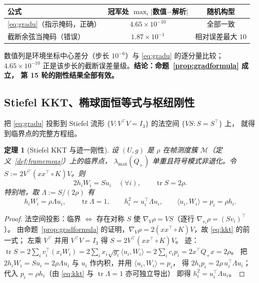 \documentclass[UTF8,11pt]{ctexart}
\newtheorem{theorem}{定理}[section]
\theoremstyle{definition}
\newcommand{\Lam}{\Lambda}
\newcommand{\tr}{\operatorname{tr}}
\begin{document}
\begin{center}\small
\begin{tabular}{lcc}
\hline
公式 & 冠军处 $\max_i\lvert$数值$-$解析$\rvert$ & 随机构型 \\
\hline
\eqref{eq:gradu}（指示掩码，正确） & $4.65\times10^{-10}$ & 全部一致 \\
截断余弦当掩码（错误） & $1.87\times10^{-1}$ & 相对误差最大 $10$ \\
\hline
\end{tabular}
\end{center}

\noindent 数值列是环境坐标中心差分（步长 $10^{-6}$）与 \eqref{eq:gradu} 的逐分量比较；
$4.65\times10^{-10}$ 正是该步长的截断误差量级。\textbf{结论：命题~\ref{prop:gradformula} 成立，
第 15 轮的刚性结果全部有效。}

\subsection{Stiefel KKT、椭球面恒等式与枢纽刚性}\label{sec:r17:kkt}

把 \eqref{eq:gradu} 投影到 Stiefel 流形 $\{V:V^\top V=I_3\}$ 的法空间 $\{VS:S=S^\top\}$ 上，
就得到临界点的完整方程组。

\begin{theorem}[Stiefel KKT 与迹一刚性]\label{thm:stiefelkkt}
设 $(U,g)$ 是 $\rho$ 在帧测度簇 $\mathcal M$（定义~\ref{def:framemeas}）上的临界点，
$\lambda_{\max}(Q_+)$ 单重且符号模式非退化。令 $S:=2V^\top(xx^\top\!\circ K)V$。则
\begin{equation}\label{eq:kkt}
2h_iW_i=Su_i\quad(\forall i),\qquad \tr S=2\rho .
\end{equation}
特别地，取 $\Lam:=S/(2\rho)$ 有
\begin{equation}\label{eq:trace1}
h_iW_i=\rho\Lam u_i,\qquad \tr\Lam=1,\qquad h_i^2=u_i^\top\!\Lam u_i,\qquad
\langle u_i,W_i\rangle=p_i=\rho h_i .
\end{equation}
\end{theorem}

\begin{proof}
法空间投影：临界 $\Leftrightarrow$ 存在对称 $S$ 使 $\nabla_V\rho=VS$（逐行 $\nabla_{v_i}\rho=(Sv_i)^\top$）。
由命题~\ref{prop:gradformula} 的证明，$\nabla_V\rho=2(xx^\top\!\circ K)V$，故 \eqref{eq:kkt} 的前一式；
左乘 $V^\top$ 并用 $V^\top V=I_3$ 得 $S=2V^\top(xx^\top\!\circ K)V$。
迹：$\tr S=2\sum_i v_i^\top(x_iW_i)=2\sum_ix_i\sqrt{g_i}\langle u_i,W_i\rangle=2\sum_ic_ip_i=2x^\top Q_+x=2\rho$。
把 $2h_iW_i=Su_i=2\rho\Lam u_i$ 与 $u_i$ 作内积，并用 $\langle u_i,W_i\rangle=p_i$，
得 $2h_ip_i=2\rho\,u_i^\top\!\Lam u_i$；代入 $p_i=\rho h_i$（由 \eqref{eq:kkt} 与 $\tr\Lam=1$ 亦可独立导出）
即得 $h_i^2=u_i^\top\!\Lam u_i$。
\end{proof}
\end{document}
